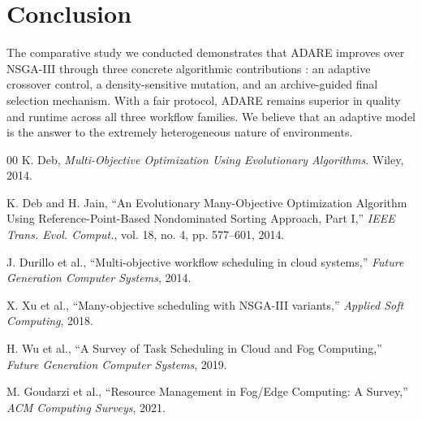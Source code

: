 \documentclass[conference]{IEEEtran}
\begin{document}
\section{Conclusion}
The comparative study we conducted demonstrates that ADARE improves over NSGA-III through three concrete algorithmic contributions : an adaptive crossover control, a density-sensitive mutation, and an archive-guided final selection mechanism.
With a fair protocol, ADARE remains superior in quality and runtime across all three workflow families. We believe that an adaptive model is the answer to the extremely heterogeneous nature of environments.

\begin{thebibliography}{00}
K. Deb, \textit{Multi-Objective Optimization Using Evolutionary Algorithms}. Wiley, 2014.

K. Deb and H. Jain, ``An Evolutionary Many-Objective Optimization Algorithm Using Reference-Point-Based Nondominated Sorting Approach, Part I,'' \textit{IEEE Trans. Evol. Comput.}, vol. 18, no. 4, pp. 577--601, 2014.

J. Durillo et al., ``Multi-objective workflow scheduling in cloud systems,'' \textit{Future Generation Computer Systems}, 2014.

X. Xu et al., ``Many-objective scheduling with NSGA-III variants,'' \textit{Applied Soft Computing}, 2018.

H. Wu et al., ``A Survey of Task Scheduling in Cloud and Fog Computing,'' \textit{Future Generation Computer Systems}, 2019.

M. Goudarzi et al., ``Resource Management in Fog/Edge Computing: A Survey,'' \textit{ACM Computing Surveys}, 2021.
\end{thebibliography}
\end{document}
